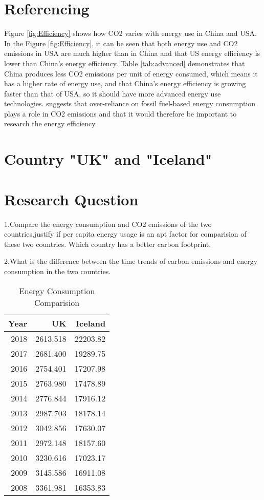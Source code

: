 \documentclass[11pt,a4paper,]{article}
\begin{document}
\hypertarget{referencing-2}{%
\section{Referencing}\label{referencing-2}}

Figure \ref{fig:Efficiency} shows how CO2 varies with energy use in China and USA. In the Figure \ref{fig:Efficiency}, it can be seen that both energy use and CO2 emissions in USA are much higher than in China and that US energy efficiency is lower than China's energy efficiency. Table \ref{tab:advanced} demonstrates that China produces less CO2 emissions per unit of energy consumed, which means it has a higher rate of energy use, and that China's energy efficiency is growing faster than that of USA, so it should have more advanced energy use technologies. \textcite{Asumadu2016Energy} suggests that over-reliance on fossil fuel-based energy consumption plays a role in CO2 emissions and that it would therefore be important to research the energy efficiency.

\section*{Country "UK" and "Iceland"}

\hypertarget{research-question-3}{%
\section{Research Question}\label{research-question-3}}

1.Compare the energy consumption and CO2 emissions of the two countries,justify if per capita energy usage is an apt factor for comparision of these two countries. Which country has a better carbon footprint.

2.What is the difference between the time trends of carbon emissions and energy consumption in the two countries.

\begin{table}[!h]

\caption{\label{tab:Energy-Consumption-Comparision}Energy Consumption Comparision}
\centering
\begin{tabular}[t]{r|r|r}
\hline
Year & UK & Iceland\\
\hline
2018 & 2613.518 & 22203.82\\
\hline
2017 & 2681.400 & 19289.75\\
\hline
2016 & 2754.401 & 17207.98\\
\hline
2015 & 2763.980 & 17478.89\\
\hline
2014 & 2776.844 & 17916.12\\
\hline
2013 & 2987.703 & 18178.14\\
\hline
2012 & 3042.856 & 17630.07\\
\hline
2011 & 2972.148 & 18157.60\\
\hline
2010 & 3230.616 & 17023.17\\
\hline
2009 & 3145.586 & 16911.08\\
\hline
2008 & 3361.981 & 16353.83\\
\hline
\end{tabular}
\end{table}
\end{document}
